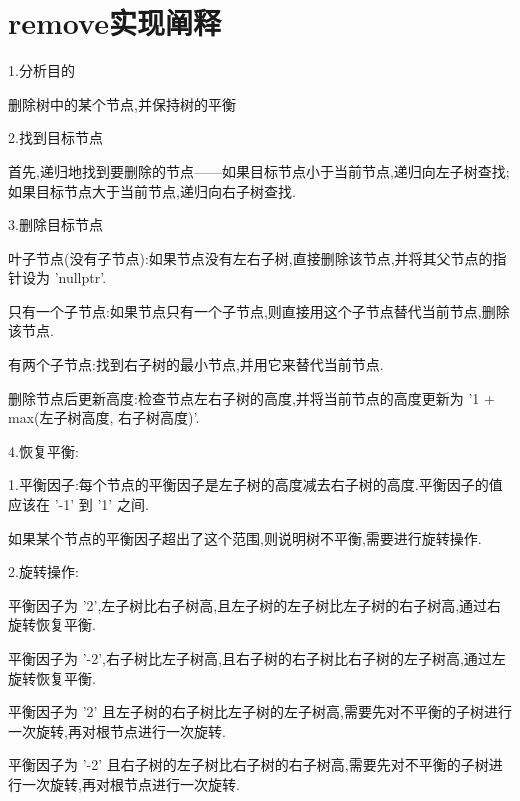\documentclass[UTF8]{ctexart}
\begin{document}
\pagestyle{fancy}
\fancyhead{}

\section{remove实现阐释}

1.分析目的

删除树中的某个节点,并保持树的平衡



2.找到目标节点

首先,递归地找到要删除的节点——如果目标节点小于当前节点,递归向左子树查找;如果目标节点大于当前节点,递归向右子树查找.



3.删除目标节点

   叶子节点(没有子节点):如果节点没有左右子树,直接删除该节点,并将其父节点的指针设为 'nullptr'.


   只有一个子节点:如果节点只有一个子节点,则直接用这个子节点替代当前节点,删除该节点.


   有两个子节点:找到右子树的最小节点,并用它来替代当前节点.


   删除节点后更新高度:检查节点左右子树的高度,并将当前节点的高度更新为 '1 + max(左子树高度, 右子树高度)'.



4.恢复平衡:

    1.平衡因子:每个节点的平衡因子是左子树的高度减去右子树的高度.平衡因子的值应该在 '-1' 到 '1' 之间.

    如果某个节点的平衡因子超出了这个范围,则说明树不平衡,需要进行旋转操作.



    2.旋转操作:

    
    平衡因子为 '2',左子树比右子树高,且左子树的左子树比左子树的右子树高,通过右旋转恢复平衡.
    
    平衡因子为 '-2',右子树比左子树高,且右子树的右子树比右子树的左子树高,通过左旋转恢复平衡.

    平衡因子为 '2' 且左子树的右子树比左子树的左子树高,需要先对不平衡的子树进行一次旋转,再对根节点进行一次旋转.
    
    平衡因子为 '-2' 且右子树的左子树比右子树的右子树高,需要先对不平衡的子树进行一次旋转,再对根节点进行一次旋转.
\end{document}
